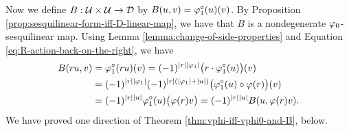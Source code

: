 

Now we define $B: \mathcal U\times \mathcal U \to \mathcal{D}$ by $B(u, v) = \varphi_1^\circ (u)(v)$. 
By Proposition \ref{prop:sesquilinear-form-iff-D-linear-map}, we have that $B$ is a nondegenerate $\varphi_0$-sesquilinear map. 
Using Lemma \ref{lemma:change-of-side-properties} and Equation \eqref{eq:R-action-back-on-the-right}, we have
%
\begin{equation*}
    \begin{split}
        B(ru,v) &= \varphi_1^\circ (ru)(v) = (-1)^{|r||\varphi_1|} \big(r \cdot \varphi_1^\circ (u) \big) (v)\\ &= (-1)^{|r||\varphi_1|} (-1)^{|r|(|\varphi_1| + |u|)} \big(\varphi_1^\circ (u) \circ \varphi(r) \big)(v) \\ &= (-1)^{|r||u|} \varphi_1^\circ (u) \big( \varphi(r)v \big)= (-1)^{|r||u|} B(u,\varphi(r)v).
    \end{split}
\end{equation*}
We have proved one direction of Theorem \ref{thm:vphi-iff-vphi0-and-B}, below. 


